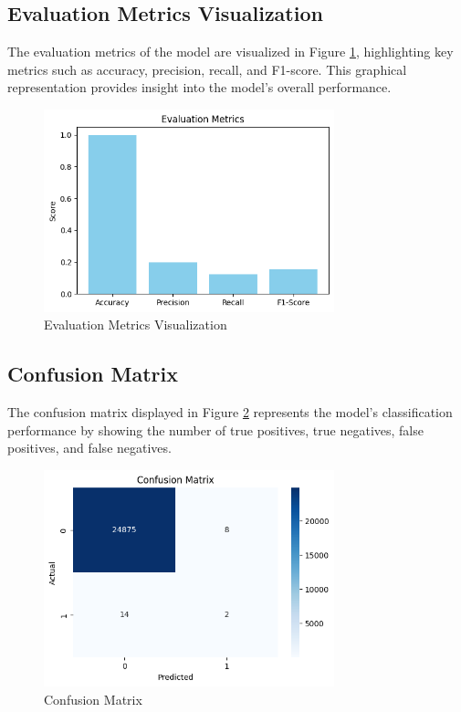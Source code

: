 	\subsection{Evaluation Metrics Visualization}
	The evaluation metrics of the model are visualized in Figure \ref{fig:evaluation_metrics}, highlighting key metrics such as accuracy, precision, recall, and F1-score. This graphical representation provides insight into the model's overall performance.
	
	\begin{figure}[h!]
		\centering
		\includegraphics[width=0.75\textwidth]{./figures_akash/evaluation_metrics.png} %
		\caption{Evaluation Metrics Visualization}
		\label{fig:evaluation_metrics}
	\end{figure}
	
	\subsection{Confusion Matrix}
	The confusion matrix displayed in Figure \ref{fig:confusion_matrix} represents the model's classification performance by showing the number of true positives, true negatives, false positives, and false negatives.
	
	\begin{figure}[h!]
		\centering
		\includegraphics[width=0.75\textwidth]{./figures_akash/confusion_matrix.png} %
		\caption{Confusion Matrix}
		\label{fig:confusion_matrix}
	\end{figure}
	
